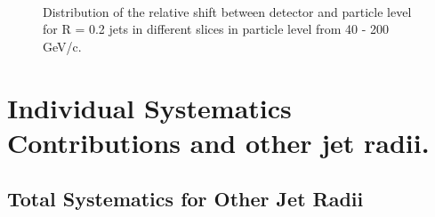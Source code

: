 \begin{figure}[h!]
    \qquad
    \\
    \qquad
    \caption{Distribution of the relative \pT shift between detector and particle level \pT for R = 0.2 jets in different slices in particle level \pT from 40 - 200 GeV/c.}
    \label{fig:EnergyScaleSlices2pPb}
\end{figure}

\newpage

\section{Individual Systematics Contributions and other jet radii.}
\label{sec:AppendixSystematics}

\subsection{Total Systematics for Other Jet Radii}
\label{subsec:appendixTotalSystematics}

